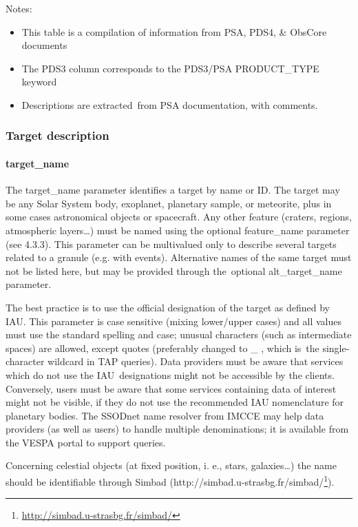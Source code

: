 \documentclass[11pt,a4paper]{ivoa}
\begin{document}
Notes:

\begin{itemize}
\item This table is a compilation of information from PSA, PDS4, \& ObsCore documents
\item The PDS3 column corresponds to the PDS3/PSA PRODUCT\_TYPE keyword
\item Descriptions are extracted from PSA documentation, with comments.
\end{itemize}

\subsubsection{Target description}

\paragraph{target\_name}

The target\_name parameter identifies a target by name or ID. The target may be any Solar System body, exoplanet, planetary sample, or meteorite, plus in some cases astronomical objects or spacecraft. Any other feature (craters, regions, atmospheric layers…) must be named using the optional feature\_name parameter (see 4.3.3). This parameter can be multivalued only to describe several targets related to a granule (e.g. with events). Alternative names of the same target must not be listed here, but may be provided through the optional alt\_target\_name parameter. 

The best practice is to use the official designation of the target as defined by IAU. This parameter is case sensitive (mixing lower/upper cases) and all values must use the standard spelling and case; unusual characters (such as intermediate spaces) are allowed, except quotes (preferably changed to \_ , which is the single-character wildcard in TAP queries). Data providers must be aware that services which do not use the IAU designations might not be accessible by the clients. Conversely, users must be aware that some services containing data of interest might not be visible, if they do not use the recommended IAU nomenclature for planetary bodies. The SSODnet name resolver from IMCCE may help data providers (as well as users) to handle multiple denominations; it is available from the VESPA portal to support queries.

Concerning celestial objects (at fixed position, i. e., stars, galaxies…) the name should be identifiable through Simbad (http://simbad.u-strasbg.fr/simbad/\footnote{\url{http://simbad.u-strasbg.fr/simbad/}}).
\end{document}
